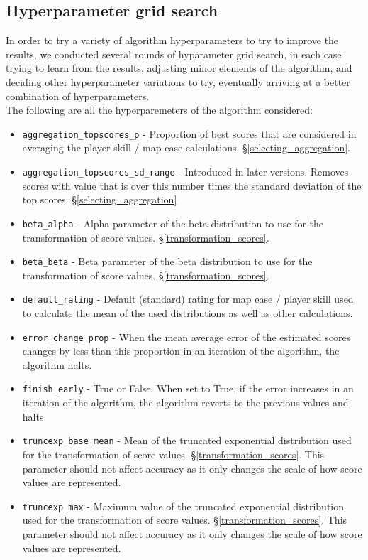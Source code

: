 \documentclass[12pt,a4paper]{article}
\begin{document}
\subsection{Hyperparameter grid search}
\label{hyperparameter_grid_search}

In order to try a variety of algorithm hyperparameters to try to improve the results, we conducted several rounds of hyparameter grid search, in each case trying to learn from the results, adjusting minor elements of the algorithm, and deciding other hyperparameter variations to try, eventually arriving at a better combination of hyperparameters.\\

The following are all the hyperparemeters of the algorithm considered:

\begin{itemize}

\item \lstinline|aggregation_topscores_p| - Proportion of best scores that are considered in averaging the player skill  / map ease calculations. \S \ref{selecting_aggregation}.
\item \lstinline|aggregation_topscores_sd_range| - Introduced in later versions. Removes scores with value that is over this number times the standard deviation of the top scores. \S \ref{selecting_aggregation}
\item \lstinline|beta_alpha| - Alpha parameter of the beta distribution to use for the transformation of score values. \S \ref{transformation_scores}.
\item \lstinline|beta_beta| - Beta parameter of the beta distribution to use for the transformation of score values. \S \ref{transformation_scores}.
\item \lstinline|default_rating| - Default (standard) rating for map ease / player skill used to calculate the mean of the used distributions as well as other calculations.
\item \lstinline|error_change_prop| - When the mean average error of the estimated scores changes by less than this proportion in an iteration of the algorithm, the algorithm halts.
\item \lstinline|finish_early| - True or False. When set to True, if the error increases in an iteration of the algorithm, the algorithm reverts to the previous values and halts.
\item \lstinline|truncexp_base_mean| - Mean of the truncated exponential distribution used for the transformation of score values. \S \ref{transformation_scores}. This parameter should not affect accuracy as it only changes the scale of how score values are represented.
\item \lstinline|truncexp_max| - Maximum value of the truncated exponential distribution used for the transformation of score values. \S \ref{transformation_scores}. This parameter should not affect accuracy as it only changes the scale of how score values are represented.

\end{itemize}
\end{document}
